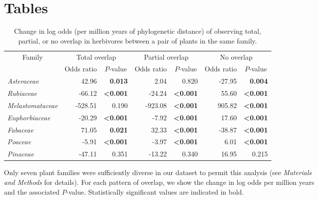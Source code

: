 \documentclass[12pt]{article}
\begin{document}
\newpage

\renewcommand*{\bibfont}{\raggedright}



\newpage
\section*{Tables}

  \begin{table}[!h]
  \caption{\small Change in log odds (per million years of phylogenetic distance) of observing total, partial, or
  no overlap in herbivores between a pair of plants in the same family. }
  \label{family_slopes_ph}
  \begin{tabular}{|l  rrr rrr|}
  \hline
  \multicolumn{1}{|c}{\multirow{2}{*}{Family}}
  & \multicolumn{2}{|c}{Total overlap} & \multicolumn{2}{|c}{Partial overlap} & \multicolumn{2}{|c|}{No overlap} \\
  \cline{2-7}
   & \multicolumn{1}{|c}{Odds ratio} & \multicolumn{1}{|c}{$P$-value} & \multicolumn{1}{|c}{Odds ratio} & \multicolumn{1}{|c}{$P$-value} & \multicolumn{1}{|c}{Odds ratio} & \multicolumn{1}{|c|}{$P$-value} \\
    \hline
  \emph{Asteraceae}      &  42.96 & \textbf{0.013}          &   2.04 & 0.820                   & -27.95 & \textbf{0.004} \\
  \emph{Rubiaceae}       & -66.12 & \textbf{\textless0.001} & -24.24 & \textbf{\textless0.001} &  55.60 & \textbf{\textless0.001} \\
  \emph{Melastomataceae} &-528.51 & 0.190                   &-923.08 & \textbf{\textless0.001} & 905.82 & \textbf{\textless0.001} \\
  \emph{Euphorbiaceae}   & -20.29 & \textbf{\textless0.001} &  -7.92 & \textbf{\textless0.001} &  17.60 & \textbf{\textless0.001} \\
  \emph{Fabaceae}        &  71.05 & \textbf{0.021}          &  32.33 & \textbf{\textless0.001} & -38.87 & \textbf{\textless0.001} \\
  \emph{Poaceae}         &  -5.91 & \textbf{\textless0.001} &  -3.97 & \textbf{\textless0.001} &   6.01 & \textbf{\textless0.001} \\
  \emph{Pinaceae}        & -47.11 & 0.351                   & -13.22 & 0.340                   &  16.95 & 0.215 \\
  \hline
  \end{tabular}
  \smallskip
  \footnotesize

  Only seven plant families were sufficiently diverse in our  dataset to permit this analysis
  (see \emph{Materials \\and Methods} for details). For each pattern of overlap, we show the change
  in log odds per million years \\and the associated $P$-value. Statistically significant values are
  indicated in bold. \\

  \end{table}
\end{document}
